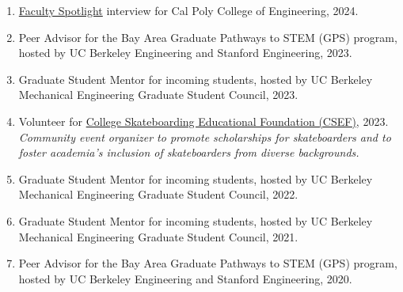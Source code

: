 \begin{enumerate}[label={\arabic*.}]
	\item \href{https://ceng.calpoly.edu/connection/2024/12/ceng-faculty-spotlight-brendon-anderson/}{Faculty Spotlight} interview for Cal Poly College of Engineering, 2024.
	\item Peer Advisor for the Bay Area Graduate Pathways to STEM (GPS) program, hosted by UC Berkeley Engineering and Stanford Engineering, 2023.
	\item Graduate Student Mentor for incoming students, hosted by UC Berkeley Mechanical Engineering Graduate Student Council, 2023.
	\item Volunteer for \href{https://www.collegeskateboarding.com/}{College Skateboarding Educational Foundation (CSEF)}, 2023. \\
	\textit{Community event organizer to promote scholarships for skateboarders and to foster academia's inclusion of skateboarders from diverse backgrounds.}
	\item Graduate Student Mentor for incoming students, hosted by UC Berkeley Mechanical Engineering Graduate Student Council, 2022.
	\item Graduate Student Mentor for incoming students, hosted by UC Berkeley Mechanical Engineering Graduate Student Council, 2021.
	\item Peer Advisor for the Bay Area Graduate Pathways to STEM (GPS) program, hosted by UC Berkeley Engineering and Stanford Engineering, 2020.
\end{enumerate}
